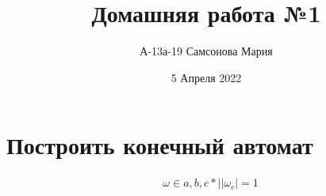 \documentclass[a4paper, 12pt]{article}
\title{Домашняя работа №1}
\author{А-13а-19 Самсонова Мария}
\date{5 Апреля 2022}
\begin{document}
\maketitle

\section{Построить конечный автомат}

\begin{align*}
&\omega \in {a,b,c}* ||\omega_{c}| = 1  
\end{align*}
\end{document}
